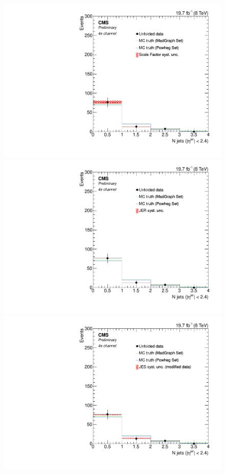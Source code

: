 \begin{figure}[hbtp]
\begin{center}
    \includegraphics[width=0.8\cmsFigWidth]{Figures/Unfolding/Systematics/ZZTo4e_CentralJets_SFSq_Mad_fr}
    \includegraphics[width=0.8\cmsFigWidth]{Figures/Unfolding/Systematics/ZZTo4e_CentralJets_JER_Mad_fr}   
    \includegraphics[width=0.8\cmsFigWidth]{Figures/Unfolding/Systematics/ZZTo4e_CentralJets_JES_ModData_Mad_fr}     

\end{center}
\end{figure}
